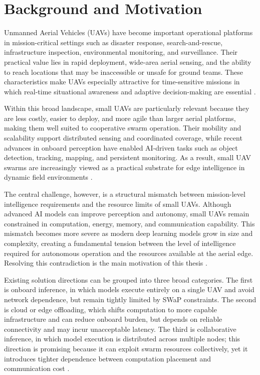 \section*{Background and Motivation}
Unmanned Aerial Vehicles (UAVs) have become important operational platforms in mission-critical settings such as disaster response, search-and-rescue, infrastructure inspection, environmental monitoring, and surveillance. Their practical value lies in rapid deployment, wide-area aerial sensing, and the ability to reach locations that may be inaccessible or unsafe for ground teams. These characteristics make UAVs especially attractive for time-sensitive missions in which real-time situational awareness and adaptive decision-making are essential \cite{mcenroe2022survey,baktayan2024slr}.

Within this broad landscape, small UAVs are particularly relevant because they are less costly, easier to deploy, and more agile than larger aerial platforms, making them well suited to cooperative swarm operation. Their mobility and scalability support distributed sensing and coordinated coverage, while recent advances in onboard perception have enabled AI-driven tasks such as object detection, tracking, mapping, and persistent monitoring. As a result, small UAV swarms are increasingly viewed as a practical substrate for edge intelligence in dynamic field environments \cite{jung2024edgeai,qu2024elastic,clerigues2024mission}.

The central challenge, however, is a structural mismatch between mission-level intelligence requirements and the resource limits of small UAVs. Although advanced AI models can improve perception and autonomy, small UAVs remain constrained in computation, energy, memory, and communication capability. This mismatch becomes more severe as modern deep learning models grow in size and complexity, creating a fundamental tension between the level of intelligence required for autonomous operation and the resources available at the aerial edge. Resolving this contradiction is the main motivation of this thesis \cite{hu2025splitreview,duan2022combined,li2024fsl,mcenroe2022survey,zhou2019edge,deng2020edge}.

Existing solution directions can be grouped into three broad categories. The first is onboard inference, in which models execute entirely on a single UAV and avoid network dependence, but remain tightly limited by SWaP constraints. The second is cloud or edge offloading, which shifts computation to more capable infrastructure and can reduce onboard burden, but depends on reliable connectivity and may incur unacceptable latency. The third is collaborative inference, in which model execution is distributed across multiple nodes; this direction is promising because it can exploit swarm resources collectively, yet it introduces tighter dependence between computation placement and communication cost \cite{qu2024elastic,wang2024jointuav,baktayan2024slr}.

